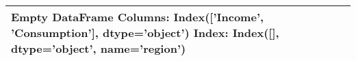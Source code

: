 \begin{tabular}{lrr}
\toprule
Empty DataFrame
Columns: Index(['Income', 'Consumption'], dtype='object')
Index: Index([], dtype='object', name='region') \\
\bottomrule
\end{tabular}
